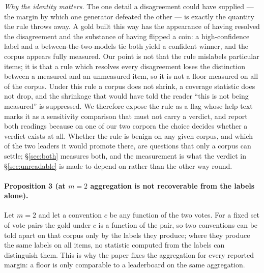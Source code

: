 \documentclass{article}
\begin{document}
\emph{Why the identity matters.} The one detail a disagreement could have supplied --- the margin by which one generator defeated the other --- is exactly the quantity the rule throws away. A gold built this way has the appearance of having resolved the disagreement and the substance of having flipped a coin: a high-confidence label and a between-the-two-models tie both yield a confident winner, and the corpus appears fully measured. Our point is not that the rule mislabels particular items; it is that a rule which resolves every disagreement loses the distinction between a measured and an unmeasured item, so it is not a floor measured on all of the corpus. Under this rule a corpus does not shrink, a coverage statistic does not drop, and the shrinkage that would have told the reader ``this is not being measured'' is suppressed. We therefore expose the rule as a flag whose help text marks it as a sensitivity comparison that must not carry a verdict, and report both readings because on one of our two corpora the choice decides whether a verdict exists at all. Whether the rule is benign on any given corpus, and which of the two leaders it would promote there, are questions that only a corpus can settle; \S\ref{sec:both} measures both, and the measurement is what the verdict in \S\ref{sec:unreadable} is made to depend on rather than the other way round.

\paragraph{Proposition 3 (at $m=2$ aggregation is not recoverable from the labels alone).} Let $m = 2$ and let a convention $c$ be any function of the two votes. For a fixed set of vote pairs the gold under $c$ is a function of the pair, so two conventions can be told apart on that corpus only by the labels they produce; where they produce the same labels on all items, no statistic computed from the labels can distinguish them. This is why the paper fixes the aggregation for every reported margin: a floor is only comparable to a leaderboard on the same aggregation.
\end{document}
